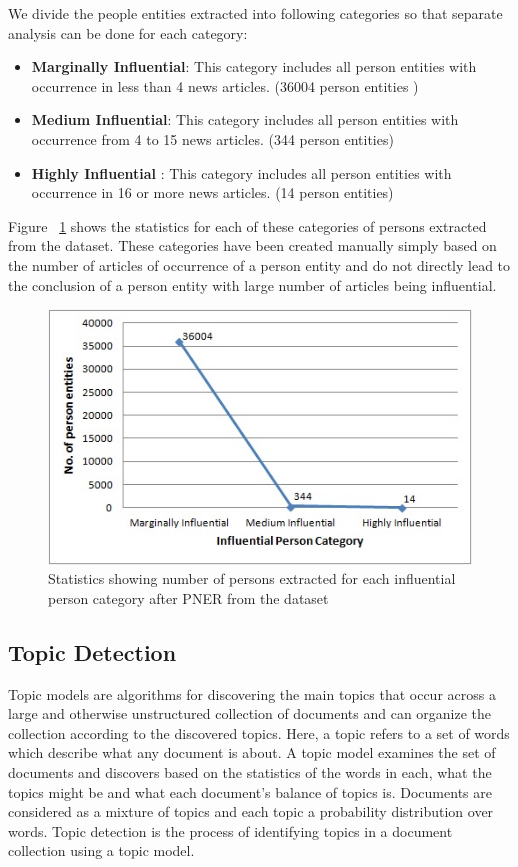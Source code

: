 \documentclass[10pt,journal,compsoc]{IEEEtran}
\begin{document}
We divide the people entities extracted into following categories so that separate analysis can be done for each category:
\begin{itemize}
 \item \textbf{Marginally Influential}: This category includes all person entities with occurrence in less than 4 news articles. (36004 person entities )
\item \textbf{Medium Influential}: This category includes all person entities with occurrence from 4 to 15 news articles. (344 person entities) 
\item \textbf{Highly Influential} : This category includes all person entities with occurrence in 16 or more news articles. (14 person entities)
\end{itemize}
Figure ~\ref{figure:res} shows the statistics for each of these categories of persons extracted from the dataset. These categories have been created manually simply based on the number of articles of occurrence of a person entity and do not directly lead to the conclusion of a person entity with large number of articles being influential.

\begin{figure}
  \centering
\includegraphics{IPChart}
\caption{Statistics showing number of persons extracted for each influential person category after PNER from the dataset}
\label{figure:res}
\end{figure} 


\subsection{Topic Detection}
\label{topic detection}

 Topic models are algorithms for discovering the main topics that occur across a large and otherwise 
unstructured collection of documents and can organize the collection according to the discovered topics.
Here, a topic refers to a set of words which describe what any document is about.
 A topic model examines the set of documents and discovers based on the statistics of the words in each, what the topics might be and what each document's balance of topics is.
Documents are considered as a mixture of topics and each topic a probability distribution over words.
 Topic detection is the process of identifying topics in a document collection using a topic model. 
\end{document}
